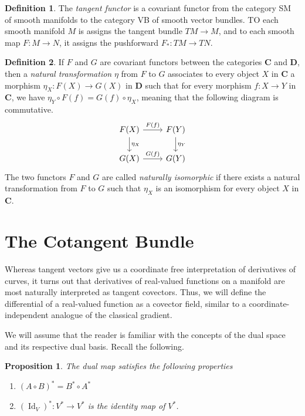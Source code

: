 \documentclass{article}
\DeclareMathOperator{\Id}{Id}
\newtheorem{proposition}[theorem]{Proposition}
\theoremstyle{remark}
\theoremstyle{definition}
\newtheorem{definition}{Definition}[section]
\begin{document}
    \begin{definition}
    The \textit{tangent functor} is a covariant functor from the category SM of smooth manifolds to the category VB of smooth vector bundles. TO each smooth manifold $M$ is assigns the tangent bundle $TM \rightarrow M$, and to each smooth map $F: M \longrightarrow N$, it assigns the pushforward $F_* : TM \longrightarrow TN$.
    \end{definition}

    \begin{definition}
    If $F$ and $G$ are covariant functors between the categories $\mathbf{C}$ and $\mathbf{D}$, then a \textit{natural transformation} $\eta$ from $F$ to $G$ associates to every object $X$ in $\mathbf{C}$ a morphism $\eta_X: F(X) \longrightarrow G(X)$ in $\mathbf{D}$ such that for every morphism $f: X \longrightarrow Y$ in $\mathbf{C}$, we have $\eta_Y \circ F(f) = G(f) \circ \eta_X$, meaning that the following diagram is commutative. 
    \[\begin{tikzcd}
    F(X) \arrow{r}{F(f)} \arrow{d}{\eta_X} & F(Y) \arrow{d}{\eta_Y} \\
    G(X) \arrow{r}{G(f)} & G(Y)
    \end{tikzcd}\]
    The two functors $F$ and $G$ are called \textit{naturally isomorphic} if there exists a natural transformation from $F$ to $G$ such that $\eta_X$ is an isomorphism for every object $X$ in $\mathbf{C}$. 
    \end{definition}

\section{The Cotangent Bundle}

  Whereas tangent vectors give us a coordinate free interpretation of derivatives of curves, it turns out that derivatives of real-valued functions on a manifold are most naturally interpreted as tangent covectors. Thus, we will define the differential of a real-valued function as a covector field, similar to a coordinate-independent analogue of the classical gradient. 

  We will assume that the reader is familiar with the concepts of the dual space and its respective dual basis. Recall the following. 

  \begin{proposition}
  The dual map satisfies the following properties 
  \begin{enumerate}
      \item $(A \circ B)^* = B^* \circ A^*$
      \item $(\Id_V)^*: V^* \longrightarrow V^*$ is the identity map of $V^*$. 
  \end{enumerate}
  \end{proposition}
\end{document}
